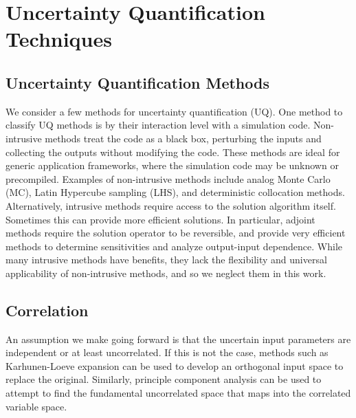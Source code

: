 
\chapter{Uncertainty Quantification Techniques} %

\label{ch:methods} %



\section{Uncertainty Quantification Methods}
We consider a few methods for uncertainty quantification (UQ).  One method to classify UQ methods is by their
interaction level with a simulation code.  Non-intrusive methods treat the code as a black box, perturbing the
inputs and collecting the outputs without modifying the code.  These methods are ideal for generic application
frameworks, where the simulation code may be unknown or precompiled.  Examples of non-intrusive methods
include analog Monte Carlo (MC), Latin Hypercube sampling (LHS), and deterministic collocation methods.
Alternatively, intrusive methods require access to the solution algorithm itself.  Sometimes this can provide
more efficient solutions.  In particular, adjoint methods require the solution operator to be reversible, and
provide very efficient methods to determine sensitivities and analyze output-input dependence.  While many
intrusive methods have benefits, they lack the flexibility and universal applicability of non-intrusive
methods, and so we neglect them in this work.

\section{Correlation}
An assumption we make going forward is that the uncertain input parameters are independent or at least
uncorrelated.  If this is not the case, methods such as Karhunen-Loeve expansion can be used to develop an orthogonal
input space to replace the original.  Similarly, principle component analysis can be used to attempt to find
the fundamental uncorrelated space that maps into the correlated variable space.


